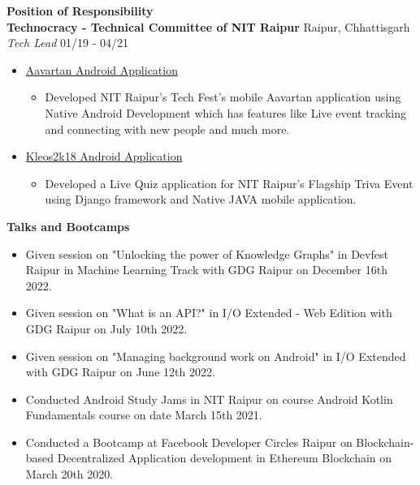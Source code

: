 \documentclass{article}
\begin{document}
\vspace{10pt}
\noindent \large \textbf{\textcolor{NavyBlue}{Position of Responsibility}} \vspace{5pt} \\
\noindent \normalsize \textbf{Technocracy - Technical Committee of NIT Raipur} \hfill Raipur, Chhattisgarh \\
\noindent \normalsize \textit{Tech Lead} \hfill 01/19 - 04/21
\begin{itemize}[noitemsep,nolistsep,leftmargin=*]
    \item {\href{https://bit.ly/aavartan}{Aavartan Android Application}
        \begin{itemize}
            \item Developed NIT Raipur's Tech Fest's mobile Aavartan application using Native Android Development which has features like Live event tracking and connecting with new people and much more.
        \end{itemize}
    }
    \item {\href{https://bit.ly/kleos2k18}{Kleos2k18 Android Application}
        \begin{itemize}
            \item Developed a Live Quiz application for NIT Raipur's Flagship Triva Event using Django framework and Native JAVA mobile application.
        \end{itemize}
    }
\end{itemize}
\noindent \large \textbf{\textcolor{NavyBlue}{Talks and Bootcamps}}
\begin{itemize}[noitemsep,nolistsep,leftmargin=*]
    \item { \normalsize Given session on "Unlocking the power of Knowledge Graphs" in Devfest Raipur in Machine Learning Track with GDG Raipur on December 16th 2022.  }
    \item { \normalsize Given session on "What is an API?" in I/O Extended - Web Edition with GDG Raipur on July 10th 2022.  }
    \item { \normalsize Given session on "Managing background work on Android" in I/O Extended with GDG Raipur on June 12th 2022.  }
    \item { \normalsize Conducted Android Study Jams in NIT Raipur on course Android Kotlin Fundamentals course on date March 15th 2021. }
    \item { \normalsize Conducted a Bootcamp at Facebook Developer Circles Raipur on Blockchain-based Decentralized Application development in Ethereum Blockchain on March 20th 2020. }
\end{itemize}
\end{document}
